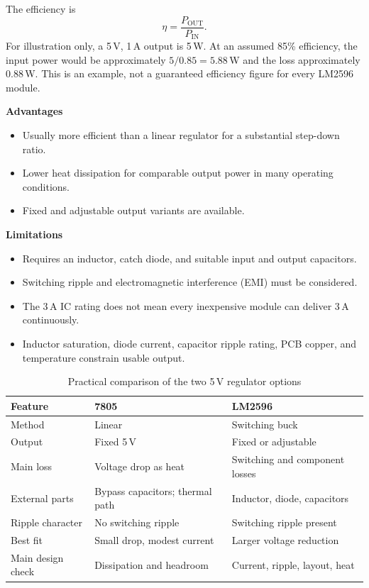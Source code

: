 \documentclass[journal,12pt,twocolumn]{IEEEtran}
\begin{document}
The efficiency is
\begin{equation}
    \boxed{\eta=\frac{P_{\mathrm{OUT}}}{P_{\mathrm{IN}}}.}
    \label{eq:efficiency}
\end{equation}
For illustration only, a 5\,V, 1\,A output is 5\,W. At an assumed
85\% efficiency, the input power would be approximately
$5/0.85=5.88$\,W and the loss approximately 0.88\,W. This is an
example, not a guaranteed efficiency figure for every LM2596
module.

\textbf{Advantages}
\begin{itemize}[leftmargin=1.5em]
    \item Usually more efficient than a linear regulator for a
    substantial step-down ratio.
    \item Lower heat dissipation for comparable output power in
    many operating conditions.
    \item Fixed and adjustable output variants are available.
\end{itemize}
\textbf{Limitations}
\begin{itemize}[leftmargin=1.5em]
    \item Requires an inductor, catch diode, and suitable input and
    output capacitors.
    \item Switching ripple and electromagnetic interference (EMI)
    must be considered.
    \item The 3\,A IC rating does not mean every inexpensive module
    can deliver 3\,A continuously.
    \item Inductor saturation, diode current, capacitor ripple
    rating, PCB copper, and temperature constrain usable output.
\end{itemize}

\begin{table}[!t]
\centering
\caption{Practical comparison of the two 5\,V regulator options}
\label{tab:reg-comparison}
\small
\begin{tabular}{|p{}|p{}|p{}|}
\hline
\textbf{Feature} & \textbf{7805} & \textbf{LM2596}\\ \hline
Method & Linear & Switching buck\\ \hline
Output & Fixed 5\,V & Fixed or adjustable\\ \hline
Main loss & Voltage drop as heat & Switching and component losses\\ \hline
External parts & Bypass capacitors; thermal path & Inductor, diode, capacitors\\ \hline
Ripple character & No switching ripple & Switching ripple present\\ \hline
Best fit & Small drop, modest current & Larger voltage reduction\\ \hline
Main design check & Dissipation and headroom & Current, ripple, layout, heat\\ \hline
\end{tabular}
\end{table}
\end{document}
